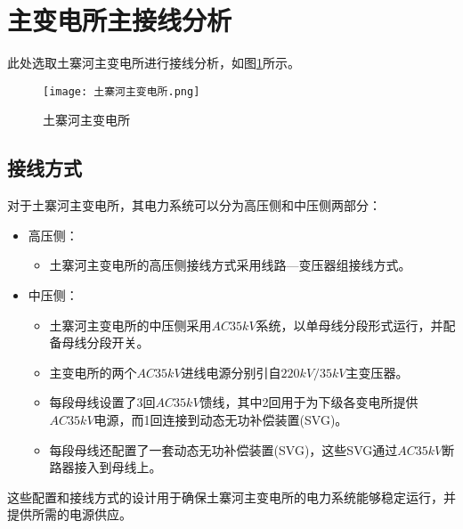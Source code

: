 \section{主变电所主接线分析}
此处选取土寨河主变电所进行接线分析，如图\ref{土寨河主变电所}所示。
\begin{figure}[h]
	\centering
	\texttt{[image: 土寨河主变电所.png]}
	\caption{土寨河主变电所}
	\label{土寨河主变电所}
\end{figure}
\subsection{接线方式}
对于土寨河主变电所，其电力系统可以分为高压侧和中压侧两部分：

\begin{itemize}
	\item 高压侧：
	\begin{itemize}
		\item 土寨河主变电所的高压侧接线方式采用线路—变压器组接线方式。
	\end{itemize}
	\item 中压侧：
	\begin{itemize}
		\item 土寨河主变电所的中压侧采用$AC35kV$系统，以单母线分段形式运行，并配备母线分段开关。
		\item 主变电所的两个$AC35kV$进线电源分别引自$220kV/35kV$主变压器。
		\item 每段母线设置了3回$AC35kV$馈线，其中2回用于为下级各变电所提供$AC35kV$电源，而1回连接到动态无功补偿装置(SVG)。
		\item 每段母线还配置了一套动态无功补偿装置(SVG)，这些SVG通过$AC35kV$断路器接入到母线上。
	\end{itemize}
\end{itemize}

这些配置和接线方式的设计用于确保土寨河主变电所的电力系统能够稳定运行，并提供所需的电源供应。
